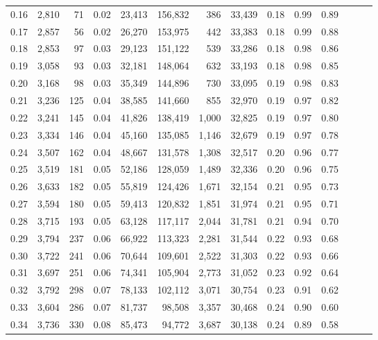\begin{tabular}{rrrrrrrrrrrrrr}
0.16 &  2,810 &   71 &  0.02 &   23,413 &  156,832 &     386 &  33,439 &  0.18 &  0.99 &      0.89 \\
0.17 &  2,857 &   56 &  0.02 &   26,270 &  153,975 &     442 &  33,383 &  0.18 &  0.99 &      0.88 \\
0.18 &  2,853 &   97 &  0.03 &   29,123 &  151,122 &     539 &  33,286 &  0.18 &  0.98 &      0.86 \\
0.19 &  3,058 &   93 &  0.03 &   32,181 &  148,064 &     632 &  33,193 &  0.18 &  0.98 &      0.85 \\
0.20 &  3,168 &   98 &  0.03 &   35,349 &  144,896 &     730 &  33,095 &  0.19 &  0.98 &      0.83 \\
0.21 &  3,236 &  125 &  0.04 &   38,585 &  141,660 &     855 &  32,970 &  0.19 &  0.97 &      0.82 \\
0.22 &  3,241 &  145 &  0.04 &   41,826 &  138,419 &   1,000 &  32,825 &  0.19 &  0.97 &      0.80 \\
0.23 &  3,334 &  146 &  0.04 &   45,160 &  135,085 &   1,146 &  32,679 &  0.19 &  0.97 &      0.78 \\
0.24 &  3,507 &  162 &  0.04 &   48,667 &  131,578 &   1,308 &  32,517 &  0.20 &  0.96 &      0.77 \\
0.25 &  3,519 &  181 &  0.05 &   52,186 &  128,059 &   1,489 &  32,336 &  0.20 &  0.96 &      0.75 \\
0.26 &  3,633 &  182 &  0.05 &   55,819 &  124,426 &   1,671 &  32,154 &  0.21 &  0.95 &      0.73 \\
0.27 &  3,594 &  180 &  0.05 &   59,413 &  120,832 &   1,851 &  31,974 &  0.21 &  0.95 &      0.71 \\
0.28 &  3,715 &  193 &  0.05 &   63,128 &  117,117 &   2,044 &  31,781 &  0.21 &  0.94 &      0.70 \\
0.29 &  3,794 &  237 &  0.06 &   66,922 &  113,323 &   2,281 &  31,544 &  0.22 &  0.93 &      0.68 \\
0.30 &  3,722 &  241 &  0.06 &   70,644 &  109,601 &   2,522 &  31,303 &  0.22 &  0.93 &      0.66 \\
0.31 &  3,697 &  251 &  0.06 &   74,341 &  105,904 &   2,773 &  31,052 &  0.23 &  0.92 &      0.64 \\
0.32 &  3,792 &  298 &  0.07 &   78,133 &  102,112 &   3,071 &  30,754 &  0.23 &  0.91 &      0.62 \\
0.33 &  3,604 &  286 &  0.07 &   81,737 &   98,508 &   3,357 &  30,468 &  0.24 &  0.90 &      0.60 \\
0.34 &  3,736 &  330 &  0.08 &   85,473 &   94,772 &   3,687 &  30,138 &  0.24 &  0.89 &      0.58 \\

\end{tabular}
